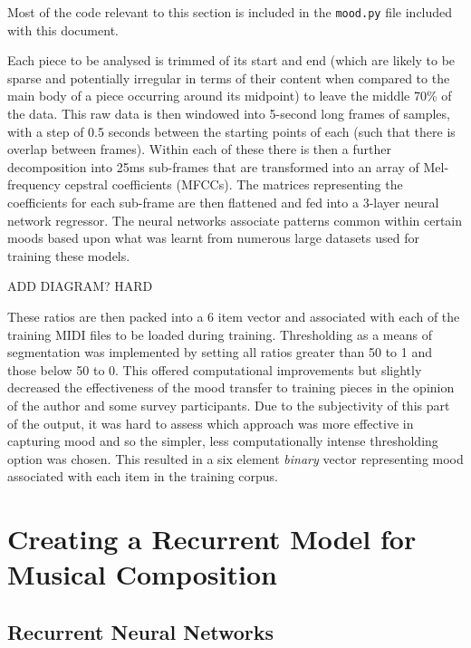 \documentclass[12pt,]{article}
\begin{document}
Most of the code relevant to this section is included in the
\texttt{mood.py} file included with this document.

Each piece to be analysed is trimmed of its start and end (which are
likely to be sparse and potentially irregular in terms of their content
when compared to the main body of a piece occurring around its midpoint)
to leave the middle 70\% of the data. This raw data is then windowed
into 5-second long frames of samples, with a step of 0.5 seconds between
the starting points of each (such that there is overlap between frames).
Within each of these there is then a further decomposition into 25ms
sub-frames that are transformed into an array of Mel-frequency cepstral
coefficients (MFCCs). The matrices representing the coefficients for
each sub-frame are then flattened and fed into a 3-layer neural network
regressor. The neural networks associate patterns common within certain
moods based upon what was learnt from numerous large datasets used for
training these models.

ADD DIAGRAM? HARD

These ratios are then packed into a 6 item vector and associated with
each of the training MIDI files to be loaded during training.
Thresholding as a means of segmentation was implemented by setting all
ratios greater than 50 to 1 and those below 50 to 0. This offered
computational improvements but slightly decreased the effectiveness of
the mood transfer to training pieces in the opinion of the author and
some survey participants. Due to the subjectivity of this part of the
output, it was hard to assess which approach was more effective in
capturing mood and so the simpler, less computationally intense
thresholding option was chosen. This resulted in a six element
\emph{binary} vector representing mood associated with each item in the
training corpus.

\hypertarget{creating-a-recurrent-model-for-musical-composition}{%
\section{Creating a Recurrent Model for Musical
Composition}\label{creating-a-recurrent-model-for-musical-composition}}

\hypertarget{recurrent-neural-networks}{%
\subsection{Recurrent Neural Networks}\label{recurrent-neural-networks}}
\end{document}
